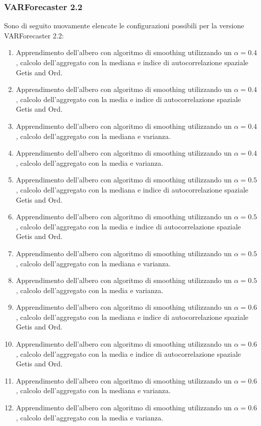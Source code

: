 \documentclass[12pt,a4paper,oneside,openright]{book}
\begin{document}
\newpage

\subsubsection{VARForecaster 2.2}

Sono di seguito nuovamente elencate le configurazioni possibili per la versione VARForecaster 2.2:
\begin{enumerate}
\item Apprendimento dell'albero con algoritmo di smoothing utilizzando un $ \alpha = 0.4$, calcolo dell'aggregato con la mediana e indice di autocorrelazione spaziale Getis and Ord.
\item Apprendimento dell'albero con algoritmo di smoothing utilizzando un $ \alpha = 0.4$, calcolo dell'aggregato con la media e indice di autocorrelazione spaziale Getis and Ord.
\item Apprendimento dell'albero con algoritmo di smoothing utilizzando un $ \alpha = 0.4$, calcolo dell'aggregato con la mediana e varianza.
\item Apprendimento dell'albero con algoritmo di smoothing utilizzando un $ \alpha = 0.4$, calcolo dell'aggregato con la media e varianza.
\item Apprendimento dell'albero con algoritmo di smoothing utilizzando un $ \alpha = 0.5$, calcolo dell'aggregato con la mediana e indice di autocorrelazione spaziale Getis and Ord.
\item Apprendimento dell'albero con algoritmo di smoothing utilizzando un $ \alpha = 0.5$, calcolo dell'aggregato con la media e indice di autocorrelazione spaziale Getis and Ord.
\item Apprendimento dell'albero con algoritmo di smoothing utilizzando un $ \alpha = 0.5$, calcolo dell'aggregato con la mediana e varianza.
\item Apprendimento dell'albero con algoritmo di smoothing utilizzando un $ \alpha = 0.5$, calcolo dell'aggregato con la media e varianza.
\item Apprendimento dell'albero con algoritmo di smoothing utilizzando un $ \alpha = 0.6$, calcolo dell'aggregato con la mediana e indice di autocorrelazione spaziale Getis and Ord.
\item Apprendimento dell'albero con algoritmo di smoothing utilizzando un $ \alpha = 0.6$, calcolo dell'aggregato con la media e indice di autocorrelazione spaziale Getis and Ord.
\item Apprendimento dell'albero con algoritmo di smoothing utilizzando un $ \alpha = 0.6$, calcolo dell'aggregato con la mediana e varianza.
\item Apprendimento dell'albero con algoritmo di smoothing utilizzando un $ \alpha = 0.6$, calcolo dell'aggregato con la media e varianza.
\end{enumerate}
\end{document}

